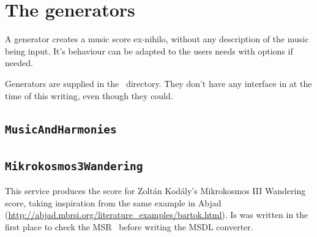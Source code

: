 



\chapter{The generators}%

A generator creates a music score ex-nihilo, without any description of the music being input. It's behaviour can be adapted to the users needs with options if needed.

Generators are supplied in the \generators\ directory. They don't have any interface in at the time of this writing, even though they could. %


\section{{\tt MusicAndHarmonies}}



\section{{\tt Mikrokosmos3Wandering}}

This service produces the score for Zoltán Kodály's Mikrokosmos III Wandering score, taking inspiration from the same example in Abjad (\url{http://abjad.mbrsi.org/literature_examples/bartok.html}).
Is was written in the first place to check the MSR \API\ before writing the MSDL converter.

